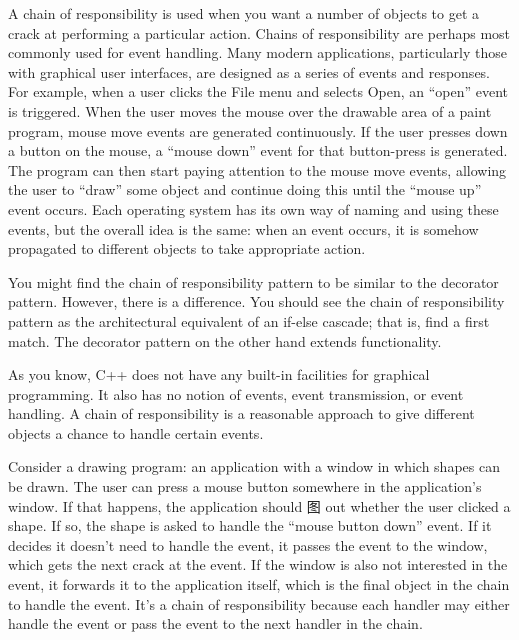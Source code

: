 
A chain of responsibility is used when you want a number of objects to get a crack at performing a particular action. Chains of responsibility are perhaps most commonly used for event handling. Many modern applications, particularly those with graphical user interfaces, are designed as a series of events and responses. For example, when a user clicks the File menu and selects Open, an “open” event is triggered. When the user moves the mouse over the drawable area of a paint program, mouse move events are generated continuously. If the user presses down a button on the mouse, a “mouse down” event for that button-press is generated. The program can then start paying attention to the mouse move events, allowing the user to “draw” some object and continue doing this until the “mouse up” event occurs. Each operating system has its own way of naming and using these events, but the overall idea is the same: when an event occurs, it is somehow propagated to different objects to take appropriate action.

You might find the chain of responsibility pattern to be similar to the decorator pattern. However, there is a difference. You should see the chain of responsibility pattern as the architectural equivalent of an if-else cascade; that is, find a first match. The decorator pattern on the other hand extends functionality.

As you know, C++ does not have any built-in facilities for graphical programming. It also has no notion of events, event transmission, or event handling. A chain of responsibility is a reasonable approach to give different objects a chance to handle certain events.


Consider a drawing program: an application with a window in which shapes can be drawn. The user can press a mouse button somewhere in the application’s window. If that happens, the application should 图 out whether the user clicked a shape. If so, the shape is asked to handle the “mouse button down” event. If it decides it doesn’t need to handle the event, it passes the event to the window, which gets the next crack at the event. If the window is also not interested in the event, it forwards it to the application itself, which is the final object in the chain to handle the event. It’s a chain of responsibility because each handler may either handle the event or pass the event to the next handler in the chain.


